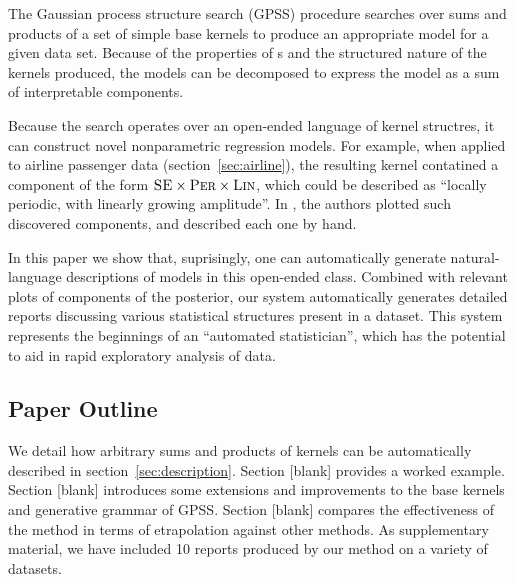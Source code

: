 \documentclass{article}
\def\ie{i.e.\ }
\let\emptyset\varnothing
\begin{document}
The Gaussian process structure search (GPSS) procedure \citep{DuvLloGroetal13} searches over sums and products of a set of simple base kernels to produce an appropriate model for a given data set.
Because of the properties of \gp{}s and the structured nature of the kernels produced, the models can be decomposed to express the model as a sum of interpretable components.

Because the search operates over an open-ended language of kernel structres, it can construct novel nonparametric regression models.
For example, when applied to airline passenger data (section~\ref{sec:airline}), the resulting kernel contatined a component of the form ${\textsc{SE}} \times {\textsc{Per}} \times {\textsc{Lin}}$, which could be described as ``locally periodic, with linearly growing amplitude''. 
In \citep{DuvLloGroetal13}, the authors plotted such discovered components, and described each one by hand.

In this paper we show that, suprisingly, one can automatically generate natural-language descriptions of \gp{} models in this open-ended class.
Combined with relevant plots of components of the posterior, our system automatically generates detailed reports discussing various statistical structures present in a dataset.
This system represents the beginnings of an ``automated statistician'', which has the potential to aid in rapid exploratory analysis of data.

\subsection{Paper Outline}
We detail how arbitrary sums and products of kernels can be automatically described in section~\ref{sec:description}.
Section [blank] provides a worked example.
Section [blank] introduces some extensions and improvements to the base kernels and generative grammar of GPSS.
Section [blank] compares the effectiveness of the method in terms of etrapolation against other methods.
As supplementary material, we have included 10 reports produced by our method on a variety of datasets.


\end{document}
